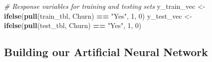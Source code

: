 \documentclass[]{article}
\newenvironment{Shaded}{\begin{snugshade}}{\end{snugshade}}
\newcommand{\KeywordTok}[1]{\textcolor[rgb]{0.13,0.29,0.53}{\textbf{#1}}}
\newcommand{\DecValTok}[1]{\textcolor[rgb]{0.00,0.00,0.81}{#1}}
\newcommand{\StringTok}[1]{\textcolor[rgb]{0.31,0.60,0.02}{#1}}
\newcommand{\CommentTok}[1]{\textcolor[rgb]{0.56,0.35,0.01}{\textit{#1}}}
\newcommand{\OperatorTok}[1]{\textcolor[rgb]{0.81,0.36,0.00}{\textbf{#1}}}
\newcommand{\NormalTok}[1]{#1}
\begin{document}
\begin{Shaded}
\begin{Highlighting}[]
\CommentTok{# Response variables for training and testing sets}
\NormalTok{y_train_vec <-}\StringTok{ }\KeywordTok{ifelse}\NormalTok{(}\KeywordTok{pull}\NormalTok{(train_tbl, Churn) }\OperatorTok{==}\StringTok{ "Yes"}\NormalTok{, }\DecValTok{1}\NormalTok{, }\DecValTok{0}\NormalTok{)}
\NormalTok{y_test_vec  <-}\StringTok{ }\KeywordTok{ifelse}\NormalTok{(}\KeywordTok{pull}\NormalTok{(test_tbl, Churn) }\OperatorTok{==}\StringTok{ "Yes"}\NormalTok{, }\DecValTok{1}\NormalTok{, }\DecValTok{0}\NormalTok{)}
\end{Highlighting}
\end{Shaded}

\subsection{Building our Artificial Neural
Network}\label{building-our-artificial-neural-network}
\end{document}
